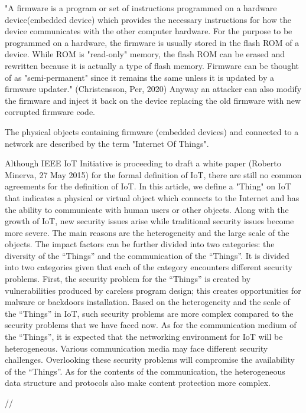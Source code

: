 \documentclass[]{report}
\begin{document}
"A firmware is a program or set of instructions programmed on a hardware device(embedded device) which provides the necessary instructions for how the device communicates with the other computer hardware. For the purpose to be programmed on a hardware, the firmware is usually stored in the flash ROM of a device. While ROM is "read-only" memory, the flash ROM can be erased and rewritten because it is actually a type of flash memory. Firmware can be thought of as "semi-permanent" since it remains the same unless it is updated by a firmware updater." (Christensson, Per, 2020) Anyway an attacker can also modify the firmware and inject it back on the device replacing the old firmware with new corrupted firmware code.

The physical objects containing firmware (embedded devices) and connected to a network are described by the term "Internet Of Things".

Although IEEE IoT Initiative is proceeding to draft a white
paper (Roberto Minerva, 27 May 2015) for the formal definition of IoT, there are still no
common agreements for the definition of IoT. In this article,
we define a "Thing" on IoT that indicates a physical or
virtual object which connects to the Internet and has the
ability to communicate with human users or other objects.
Along with the growth of IoT, new security issues arise
while traditional security issues become more severe. The
main reasons are the heterogeneity and the large scale of the
objects. The impact factors can be further divided into two
categories: the diversity of the “Things” and the
communication of the “Things”. It is divided into two
categories given that each of the category encounters
different security problems.
First, the security problem for the “Things” is created by
vulnerabilities produced by careless program design; this
creates opportunities for malware or backdoors installation.
Based on the heterogeneity and the scale of the “Things” in
IoT, such security problems are more complex compared to
the security problems that we have faced now.
As for the communication medium of the “Things”, it is
expected that the networking environment for IoT will be
heterogeneous. Various communication media may face
different security challenges. Overlooking these security
problems will compromise the availability of the “Things”.
As for the contents of the communication, the heterogeneous
data structure and protocols also make content protection more complex.

//
\end{document}
